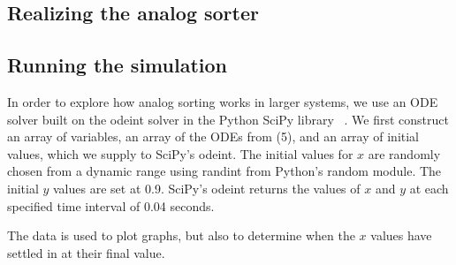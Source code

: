 \subsection{Realizing the analog sorter}


\subsection{Running the simulation}
In order to explore how analog sorting works in larger systems, we use an ODE solver built on the odeint solver in the Python SciPy library ~\cite{scipy}.
We first construct an array of variables, an array of the ODEs from (5), and an array of initial values, which we supply to SciPy's odeint. The initial values for $x$ are randomly chosen from a dynamic range using randint from Python's random module. The initial $y$ values are set at 0.9. SciPy's odeint returns the values of $x$ and $y$ at each specified time interval of 0.04 seconds. 

The data is used to plot graphs, but also to determine when the $x$ values have settled in at their final value. 



